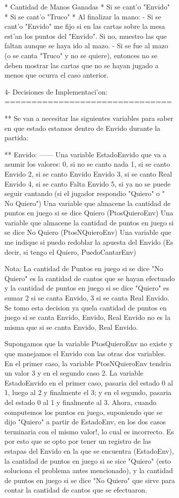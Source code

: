 \begin{figure}
\begin{figure}
  * Cantidad de Manos Ganadas
  * Si se cant'o "Envido"
  * Si se cant'o "Truco"
  * Al finalizar la mano:
    - Si se cant'o "Envido" me fijo si en las cartas sobre la mesa est'an los puntos del "Envido". Si no, muestro las que faltan aunque se haya ido al mazo.
    - Si se fue al mazo (o se canta "Truco" y no se quiere), entonces no se deben mostrar las cartas que no se hayan jugado a menos que ocurra el caso anterior.


4- Decisiones de Implementaci'on:
===============================

** Se van a necesitar las siguientes variables para saber en que estado estamos dentro de Envido durante la
partida:

** Envido:
   ------
  Una variable EstadoEnvido que va a asumir los valores:
    0, si no se canto nada
    1, si se canto Envido
    2, si se canto Envido Envido
    3, si se canto Real Envido
    4, si se canto Falta Envido
    5, si ya no se puede seguir cantando (si el jugador respondio "Quiero" o " No Quiero")
  Una variable que almacene la cantidad de puntos en juego si se dice Quiero (PtosQuieroEnv)
  Una variable que almacene la cantidad de puntos en juego si se dice No Quiero (PtosNQuieroEnv)
  Una variable que me indique si puedo redoblar la apuesta del Envido (Es decir, si tengo el Quiero, PuedoCantarEnv)

Nota:
  La cantidad de Puntos en juego si se dice "No Quiero" es la cantidad de cantos que se hayan efectuado y la cantidad
de puntos en juego si se dice "Quiero" es sumar 2 si se canta Envido, 3 si se canta Real Envido. Se tomo esta decision ya quela cantidad de puntos en juego si se canta Envido, Envido, Real Envido no es la misma que si se canta Envido, Real Envido.

  Supongamos que la variable PtosQuieroEnv no existe y que manejamos el Envido con las otras dos variables. En el primer caso, la variable PtosNQuieroEnv tendria un valor 3 y en el segundo caso 2. La variable EstadoEnvido en el primer caso, pasaria del estado 0 al 1, luego al 2 y finalmente el 3; y en el segundo, pasaria del estado 0 al 1 y finalmente al 3. Ahora, cuando computemos los puntos en juego, suponiendo que se dijo "Quiero" a partir de EstadoEnv, en los dos casos terminaria con el mismo valor!, lo cual es incorrecto. Es por esto que se opto por tener un registro de las estapas del Envido en la que se encuentra (EstadoEnv), la cantidad de puntos en juego si se sice "Quiero" (esto soluciona el problema antes mencionado), y la cantidad de puntos en juego si se dice "No Quiero" que sirve para contar la cantidad de cantos que se efectuaron.


\end{figure}
\end{figure}
